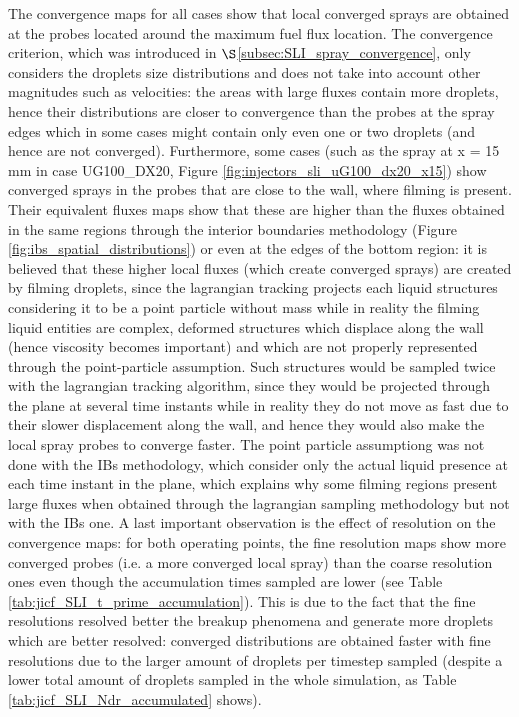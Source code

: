 The convergence maps for all cases show that local converged sprays are obtained at the probes located around the maximum fuel flux location. The convergence criterion, which was introduced in $\S$\ref{subsec:SLI_spray_convergence}, only considers the droplets size distributions and does not take into account other magnitudes such as velocities: the areas with large fluxes contain more droplets, hence their distributions are closer to convergence than the probes at the spray edges which in some cases might contain only even one or two droplets (and hence are not converged). Furthermore, some cases (such as the spray at x = 15 mm in case UG100\_DX20, Figure \ref{fig:injectors_sli_uG100_dx20_x15}) show converged sprays in the probes that are close to the wall, where filming is present. Their equivalent fluxes maps show that these are higher than the fluxes obtained in the same regions through the interior boundaries methodology (Figure \ref{fig:ibs_spatial_distributions}) or even at the edges of the bottom region: it is believed that these higher local fluxes (which create converged sprays) are created by filming droplets, since the lagrangian tracking projects each liquid structures considering it to be a point particle without mass while in reality the filming liquid entities are complex, deformed structures which displace along the wall (hence viscosity becomes important) and which are not properly represented through the point-particle assumption. Such structures would be sampled twice with the lagrangian tracking algorithm, since they would be projected through the plane at several time instants while in reality they do not move as fast due to their slower displacement along the wall, and hence they would also make the local spray probes to converge faster. The point particle assumptiong was not done with the IBs methodology, which consider only the actual liquid presence at each time instant in the plane, which explains why some filming regions present large fluxes when obtained through the lagrangian sampling methodology but not with the IBs one. A last important observation is the effect of resolution on the convergence maps: for both operating points, the fine resolution maps show more converged probes (i.e. a more converged local spray) than the coarse resolution ones even though the accumulation times sampled are lower (see Table \ref{tab:jicf_SLI_t_prime_accumulation}). This is due to the fact that the fine resolutions resolved better the breakup phenomena and generate more droplets which are better resolved: converged distributions are obtained faster with fine resolutions due to the larger amount of droplets per timestep sampled (despite a lower total amount of droplets sampled in the whole simulation, as Table \ref{tab:jicf_SLI_Ndr_accumulated} shows). 


